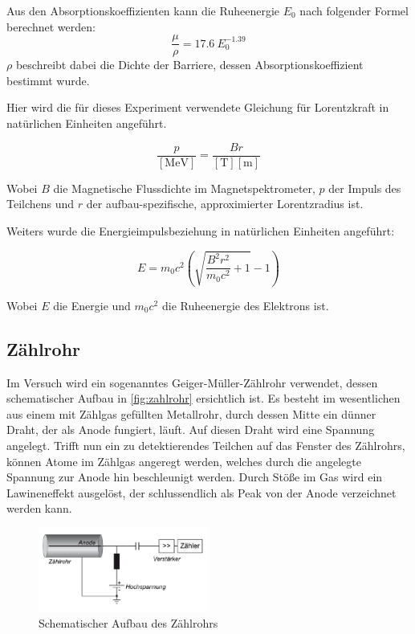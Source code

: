 \documentclass[12pt,english,ngerman]{scrartcl}
\begin{document}
Aus den Absorptionskoeffizienten kann die Ruheenergie \(E_0\) nach folgender
Formel berechnet werden:
\begin{equation}
	\frac{\mu}{\rho} = 17.6 \ E_0^{-1.39}
	\label{eq:Endpunktsenergie}
\end{equation}
\(\rho\) beschreibt dabei die Dichte der Barriere, dessen
Absorptionskoeffizient bestimmt wurde.~\cite{kuchling}

Hier wird die für dieses Experiment verwendete Gleichung für Lorentzkraft in
natürlichen Einheiten angeführt.

\begin{equation}
	\frac{p}{[\si{\mega\electronvolt}]} =  \frac{Br}{[\si{\tesla}][\si{\meter}]}
	\label{eq:lorentzimpuls}
\end{equation}

Wobei $B$ die Magnetische Flussdichte im Magnetspektrometer, $p$ der Impuls des
Teilchens und $r$ der aufbau-spezifische, approximierter Lorentzradius ist.

Weiters wurde die Energieimpulsbeziehung in natürlichen Einheiten angeführt:

\begin{equation}
	E = m_0 c^2 \left(\sqrt{\frac{ B^{2} r^{2}}{m_0 c^2} + 1} - 1 \right)
	\label{eq:energieimpulsrelation}
\end{equation}

Wobei $E$ die Energie und $m_0 c^2$ die Ruheenergie des Elektrons
ist.\cite{kuchling}

\subsection{Zählrohr}

Im Versuch wird ein sogenanntes Geiger-Müller-Zählrohr verwendet, dessen
schematischer Aufbau in \autoref{fig:zahlrohr} ersichtlich ist. Es besteht im
wesentlichen aus einem mit Zählgas gefüllten Metallrohr, durch dessen Mitte ein
dünner Draht, der als Anode fungiert, läuft. Auf diesen Draht wird eine
Spannung angelegt. Trifft nun ein zu detektierendes Teilchen auf das Fenster
des Zählrohrs, können Atome im Zählgas angeregt werden, welches durch die
angelegte Spannung zur Anode hin beschleunigt werden. Durch Stöße im Gas wird
ein Lawineneffekt ausgelöst, der schlussendlich als Peak von der Anode
verzeichnet werden kann.

\begin{figure}[H]
	\begin{center}
		\includegraphics[width = 0.5\textwidth]{./figures/zahlrohr.png}
	\end{center}
	\caption{
		Schematischer Aufbau des Zählrohrs~\cite[]{zaehlrohrvorbereitung}
	}\label{fig:zahlrohr}
\end{figure}
\end{document}
